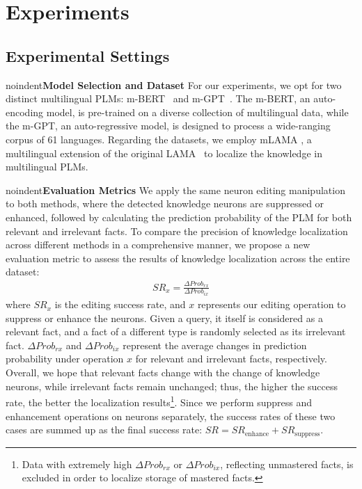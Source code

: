 \documentclass[]{article}
\newcommand{\vpara}[1]{noindent\textbf{#1 }}%
\begin{document}
\section{Experiments}
\subsection{Experimental Settings}
\vpara{Model Selection and Dataset}
For our experiments, we opt for two distinct multilingual PLMs: m-BERT~\cite{mbert} and m-GPT~\cite{mgpt}. The m-BERT, an auto-encoding model, is pre-trained on a diverse collection of multilingual data, while the m-GPT, an auto-regressive model, is designed to process a wide-ranging corpus of 61 languages. Regarding the datasets, we employ mLAMA \cite{mlama}, a multilingual extension of the original LAMA~\cite{fill-in-the-blank,lama2} to localize the knowledge in multilingual PLMs.

\vpara{Evaluation Metrics}
We apply the same neuron editing manipulation to both methods, where the detected knowledge neurons are suppressed or enhanced, followed by calculating the prediction probability of the PLM for both relevant and irrelevant facts. To compare the precision of knowledge localization across different methods in a comprehensive manner, we propose a new evaluation metric to assess the results of knowledge localization across the entire dataset:
{\small\begin{align}
    SR_x = \frac{{\Delta Prob_{rx}}}{{\Delta Prob_{ix}}}
\end{align}
}where \( SR_x \) is the editing success rate, and \( x \) represents our editing operation to suppress or enhance the neurons. Given a query, it itself is considered as a relevant fact, and a fact of a different type is randomly selected as its irrelevant fact. $\Delta Prob_{rx}$ and $\Delta Prob_{ix}$ represent the average changes in prediction probability under operation $x$ for relevant and irrelevant facts, respectively. Overall, we hope that relevant facts change with the change of knowledge neurons, while irrelevant facts remain unchanged; thus, the higher the success rate, the better the localization results\footnote{Data with extremely high $\Delta Prob_{rx}$ or \( \Delta Prob_{ix} \), reflecting unmastered facts, is excluded in order to localize storage of mastered facts.}. Since we perform suppress and enhancement operations on neurons separately, the success rates of these two cases are summed up as the final success rate: $SR = {SR_{\text{enhance}}}+{SR_{\text{suppress}}}$.
\end{document}
